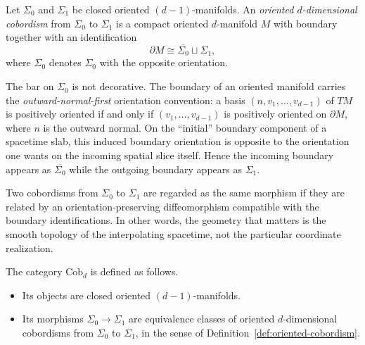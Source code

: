 \begin{definition}\label{def:oriented-cobordism}
Let $\Sigma_0$ and $\Sigma_1$ be closed oriented $(d-1)$-manifolds. An \emph{oriented $d$-dimensional cobordism} from $\Sigma_0$ to $\Sigma_1$ is a compact oriented $d$-manifold $M$ with boundary together with an identification
\begin{equation}\label{eq:cobordism-boundary}
\partial M \cong \overline{\Sigma_0} \sqcup \Sigma_1,
\end{equation}
where $\overline{\Sigma_0}$ denotes $\Sigma_0$ with the opposite orientation.
\end{definition}

\begin{remark}\label{rem:incoming-orientation}
The bar on $\Sigma_0$ is not decorative. The boundary of an oriented manifold carries the \emph{outward-normal-first} orientation convention: a basis $(n,v_1,\ldots,v_{d-1})$ of $TM$ is positively oriented if and only if $(v_1,\ldots,v_{d-1})$ is positively oriented on $\partial M$, where $n$ is the outward normal. On the ``initial'' boundary component of a spacetime slab, this induced boundary orientation is opposite to the orientation one wants on the incoming spatial slice itself. Hence the incoming boundary appears as $\overline{\Sigma_0}$ while the outgoing boundary appears as $\Sigma_1$.
\end{remark}

\noindent Two cobordisms from $\Sigma_0$ to $\Sigma_1$ are regarded as the same morphism if they are related by an orientation-preserving diffeomorphism compatible with the boundary identifications. In other words, the geometry that matters is the smooth topology of the interpolating spacetime, not the particular coordinate realization.

\begin{definition}\label{def:Cobd}
The category $\mathrm{Cob}_d$ is defined as follows.
\begin{itemize}
\item Its objects are closed oriented $(d-1)$-manifolds.
\item Its morphisms $\Sigma_0 \to \Sigma_1$ are equivalence classes of oriented $d$-dimensional cobordisms from $\Sigma_0$ to $\Sigma_1$, in the sense of Definition~\ref{def:oriented-cobordism}.
\end{itemize}
\end{definition}


